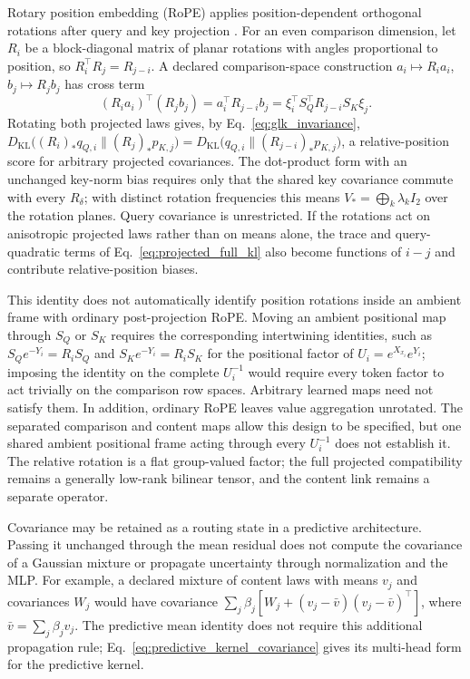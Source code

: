 \documentclass[twoside,11pt]{article}
\begin{document}
Rotary position embedding (RoPE) applies position-dependent orthogonal rotations after query and key projection \citep{su2024roformer}. For an even comparison dimension, let $R_i$ be a block-diagonal matrix of planar rotations with angles proportional to position, so $R_i^\top R_j=R_{j-i}$. A declared comparison-space construction $a_i\mapsto R_i a_i$, $b_j\mapsto R_jb_j$ has cross term
\begin{equation}
(R_i a_i)^\top(R_jb_j)
=a_i^\top R_{j-i}b_j
=\xi_i^\top S_Q^\top R_{j-i}S_K\xi_j.
\label{eq:projected_rope_kernel}
\end{equation}
Rotating both projected laws gives, by Eq.~\eqref{eq:glk_invariance}, $D_{\mathrm{KL}}\bigl((R_i)_*q_{Q,i}\|(R_j)_*p_{K,j}\bigr)=D_{\mathrm{KL}}\bigl(q_{Q,i}\|(R_{j-i})_*p_{K,j}\bigr)$, a relative-position score for arbitrary projected covariances. The dot-product form with an unchanged key-norm bias requires only that the shared key covariance commute with every $R_\delta$; with distinct rotation frequencies this means $V_*=\bigoplus_k\lambda_kI_2$ over the rotation planes. Query covariance is unrestricted. If the rotations act on anisotropic projected laws rather than on means alone, the trace and query-quadratic terms of Eq.~\eqref{eq:projected_full_kl} also become functions of $i-j$ and contribute relative-position biases.

This identity does not automatically identify position rotations inside an ambient frame with ordinary post-projection RoPE. Moving an ambient positional map through $S_Q$ or $S_K$ requires the corresponding intertwining identities, such as $S_Qe^{-Y_i}=R_iS_Q$ and $S_Ke^{-Y_i}=R_iS_K$ for the positional factor of $U_i=e^{X_{x_i}}e^{Y_i}$; imposing the identity on the complete $U_i^{-1}$ would require every token factor to act trivially on the comparison row spaces. Arbitrary learned maps need not satisfy them. In addition, ordinary RoPE leaves value aggregation unrotated. The separated comparison and content maps allow this design to be specified, but one shared ambient positional frame acting through every $U_i^{-1}$ does not establish it. The relative rotation is a flat group-valued factor; the full projected compatibility remains a generally low-rank bilinear tensor, and the content link remains a separate operator.

Covariance may be retained as a routing state in a predictive architecture. Passing it unchanged through the mean residual does not compute the covariance of a Gaussian mixture or propagate uncertainty through normalization and the MLP. For example, a declared mixture of content laws with means $v_j$ and covariances $W_j$ would have covariance $\sum_j\beta_j[W_j+(v_j-\bar v)(v_j-\bar v)^\top]$, where $\bar v=\sum_j\beta_jv_j$. The predictive mean identity does not require this additional propagation rule; Eq.~\eqref{eq:predictive_kernel_covariance} gives its multi-head form for the predictive kernel.
\end{document}
